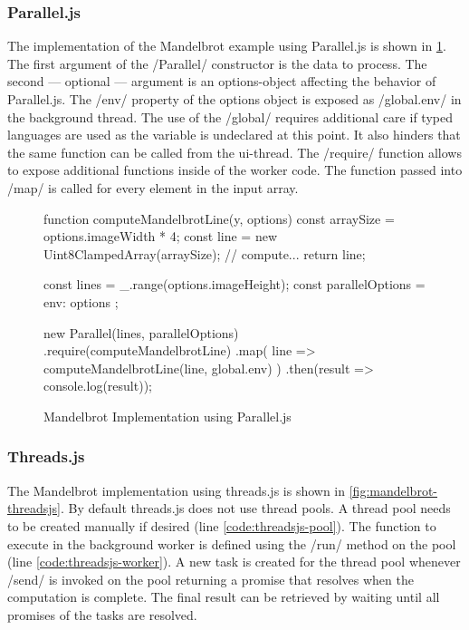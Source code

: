 \subsubsection{Parallel.js}
The implementation of the Mandelbrot example using Parallel.js is shown in \cref{fig:mandelbrot-paralleljs}. The first argument of the \javascriptinline/Parallel/ constructor is the data to process. The second --- optional ---  argument is an options-object affecting the behavior of Parallel.js. The \javascriptinline/env/ property of the options object is exposed as \javascriptinline/global.env/ in the background thread. The use of the \javascriptinline/global/ requires additional care if typed languages are used as the variable is undeclared at this point. It also hinders that the same function can be called from the ui-thread. The \javascriptinline/require/ function allows to expose additional functions inside of the worker code. The function passed into \javascriptinline/map/ is called for every element in the input array.

\begin{figure}
	\begin{javascriptcode}
function computeMandelbrotLine(y, options) {
	const arraySize = options.imageWidth * 4;
	const line = new Uint8ClampedArray(arraySize);
	// compute...
	return line;
}

const lines = _.range(options.imageHeight);
const parallelOptions = { env: options }; 

new Parallel(lines, parallelOptions)
	.require(computeMandelbrotLine)
	.map(
		line => computeMandelbrotLine(line, global.env)
	)
	.then(result => console.log(result));
\end{javascriptcode}

\caption{Mandelbrot Implementation using Parallel.js}
\label{fig:mandelbrot-paralleljs}
\end{figure}

\subsubsection{Threads.js}
 The Mandelbrot implementation using threads.js is shown in \cref{fig:mandelbrot-threadsjs}. By default threads.js does not use thread pools. A thread pool needs to be created manually if desired (line \ref{code:threadsjs-pool}). The function to execute in the background worker is defined using the \javascriptinline/run/ method on the pool (line \ref{code:threadsjs-worker}). A new task is created for the thread pool whenever \javascriptinline/send/ is invoked on the pool returning a promise that resolves when the computation is complete. The final result can be retrieved by waiting until all promises of the tasks are resolved.


